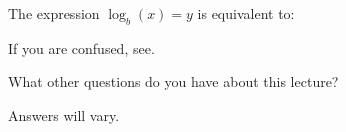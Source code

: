 \documentclass{ximera}
\begin{document}
\begin{question}
  The expression $\log_b(x) = y$ is equivalent to:
  \begin{solution}
    \begin{hint}
      If you are confused, see.
    \end{hint}
    \begin{multiple-choice}
    \end{multiple-choice}  
  \end{solution}
\end{question}


What other questions do you have about this lecture?
\begin{freeResponse}
Answers will vary.
\end{freeResponse}
\end{document}
